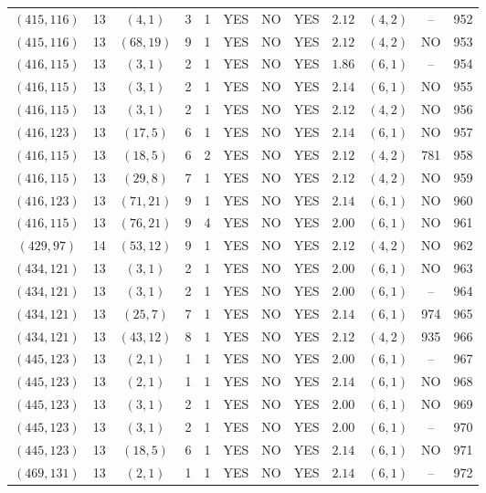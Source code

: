 \begin{longtable}{|c|c|c|c|c|c|c|c|c|c|c|c|}
$(415,116)$ & 13 & $(4,1)$ & 3 & 1 & YES & NO & YES & $2.12$ & $(4,2)$ & -- & 952\\
$(415,116)$ & 13 & $(68,19)$ & 9 & 1 & YES & NO & YES & $2.12$ & $(4,2)$ & NO & 953\\
$(416,115)$ & 13 & $(3,1)$ & 2 & 1 & YES & NO & YES & $1.86$ & $(6,1)$ & -- & 954\\
$(416,115)$ & 13 & $(3,1)$ & 2 & 1 & YES & NO & YES & $2.14$ & $(6,1)$ & NO & 955\\
$(416,115)$ & 13 & $(3,1)$ & 2 & 1 & YES & NO & YES & $2.12$ & $(4,2)$ & NO & 956\\
$(416,123)$ & 13 & $(17,5)$ & 6 & 1 & YES & NO & YES & $2.14$ & $(6,1)$ & NO & 957\\
$(416,115)$ & 13 & $(18,5)$ & 6 & 2 & YES & NO & YES & $2.12$ & $(4,2)$ & 781 & 958\\
$(416,115)$ & 13 & $(29,8)$ & 7 & 1 & YES & NO & YES & $2.12$ & $(4,2)$ & NO & 959\\
$(416,123)$ & 13 & $(71,21)$ & 9 & 1 & YES & NO & YES & $2.14$ & $(6,1)$ & NO & 960\\
$(416,115)$ & 13 & $(76,21)$ & 9 & 4 & YES & NO & YES & $2.00$ & $(6,1)$ & NO & 961\\
$(429,97)$ & 14 & $(53,12)$ & 9 & 1 & YES & NO & YES & $2.12$ & $(4,2)$ & NO & 962\\
$(434,121)$ & 13 & $(3,1)$ & 2 & 1 & YES & NO & YES & $2.00$ & $(6,1)$ & NO & 963\\
$(434,121)$ & 13 & $(3,1)$ & 2 & 1 & YES & NO & YES & $2.00$ & $(6,1)$ & -- & 964\\
$(434,121)$ & 13 & $(25,7)$ & 7 & 1 & YES & NO & YES & $2.14$ & $(6,1)$ & 974 & 965\\
$(434,121)$ & 13 & $(43,12)$ & 8 & 1 & YES & NO & YES & $2.12$ & $(4,2)$ & 935 & 966\\
$(445,123)$ & 13 & $(2,1)$ & 1 & 1 & YES & NO & YES & $2.00$ & $(6,1)$ & -- & 967\\
$(445,123)$ & 13 & $(2,1)$ & 1 & 1 & YES & NO & YES & $2.14$ & $(6,1)$ & NO & 968\\
$(445,123)$ & 13 & $(3,1)$ & 2 & 1 & YES & NO & YES & $2.00$ & $(6,1)$ & NO & 969\\
$(445,123)$ & 13 & $(3,1)$ & 2 & 1 & YES & NO & YES & $2.00$ & $(6,1)$ & -- & 970\\
$(445,123)$ & 13 & $(18,5)$ & 6 & 1 & YES & NO & YES & $2.14$ & $(6,1)$ & NO & 971\\
$(469,131)$ & 13 & $(2,1)$ & 1 & 1 & YES & NO & YES & $2.14$ & $(6,1)$ & -- & 972\\

\end{longtable}
